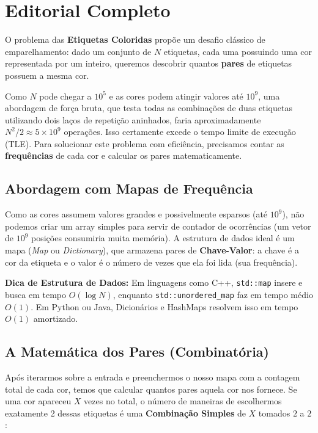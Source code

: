 \documentclass[11pt]{article}
\begin{document}
\section*{Editorial Completo}

O problema das \textbf{Etiquetas Coloridas} propõe um desafio clássico de emparelhamento: dado um conjunto de $N$ etiquetas, cada uma possuindo uma cor representada por um inteiro, queremos descobrir quantos \textbf{pares} de etiquetas possuem a mesma cor. 

Como $N$ pode chegar a $10^5$ e as cores podem atingir valores até $10^9$, uma abordagem de força bruta, que testa todas as combinações de duas etiquetas utilizando dois laços de repetição aninhados, faria aproximadamente $N^2 / 2 \approx 5 \times 10^9$ operações. Isso certamente excede o tempo limite de execução (TLE). Para solucionar este problema com eficiência, precisamos contar as \textbf{frequências} de cada cor e calcular os pares matematicamente.

\subsection*{Abordagem com Mapas de Frequência}

Como as cores assumem valores grandes e possivelmente esparsos (até $10^9$), não podemos criar um array simples para servir de contador de ocorrências (um vetor de $10^9$ posições consumiria muita memória). A estrutura de dados ideal é um mapa (\textit{Map} ou \textit{Dictionary}), que armazena pares de \textbf{Chave-Valor}: a chave é a cor da etiqueta e o valor é o número de vezes que ela foi lida (sua frequência).

\begin{notebox}
\textbf{Dica de Estrutura de Dados:} Em linguagens como C++, \texttt{std::map} insere e busca em tempo $O(\log N)$, enquanto \texttt{std::unordered\_map} faz em tempo médio $O(1)$. Em Python ou Java, Dicionários e HashMaps resolvem isso em tempo $O(1)$ amortizado. 
\end{notebox}

\subsection*{A Matemática dos Pares (Combinatória)}

Após iterarmos sobre a entrada e preenchermos o nosso mapa com a contagem total de cada cor, temos que calcular quantos pares aquela cor nos fornece. Se uma cor apareceu $X$ vezes no total, o número de maneiras de escolhermos exatamente 2 dessas etiquetas é uma \textbf{Combinação Simples} de $X$ tomados $2$ a $2$:
\end{document}
